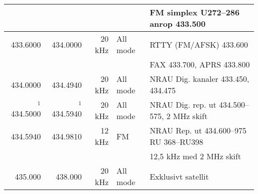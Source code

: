 \begin{landscape}
\begin{tabular}{rrrll}
                                  &               &               &                     & FM simplex U272--286 \textbf{anrop 433.500}                  \\ \hline
	         433.6000         & 434.0000      & 20 kHz        & All mode            & RTTY (FM/AFSK) 433.600                                       \\
                                  &               &               &                     & FAX 433.700, APRS 433.800                                    \\ \hline
	         434.0000         & 434.4940      & 20 kHz        & All mode            & NRAU Dig. kanaler 433.450, 434.475                           \\ \hline
	    $^1$ 434.5000         & $^1$ 434.5940 & 20 kHz        & All mode            & NRAU Dig. rep. ut 434.500--575, 2 MHz skift                  \\ \hline
	         434.5940         & 434.9810      & 12 kHz        & FM                  & NRAU Rep. ut 434.600--975 RU 368--RU398                      \\
                                  &               &               &                     & 12,5 kHz med 2 MHz skift                                     \\ \hline
	          435.000         & 438.000       & 20 kHz        & All mode            & Exklusivt satellit
\end{tabular}

\end{landscape}
